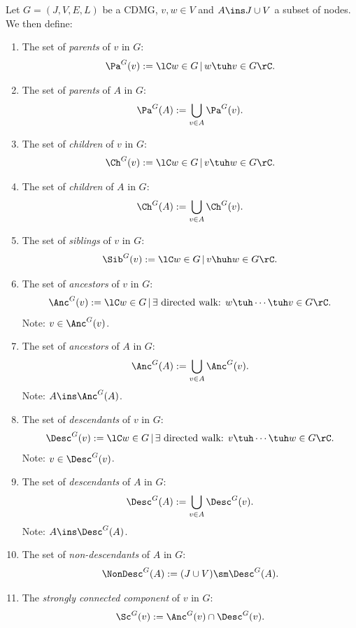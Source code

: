 \begin{Def}
     Let $G=(J,V,E,L)$ be a CDMG, $v,w \in V$ and $A \ins J \cup V$ a subset of nodes.
     We then define:
     \begin{enumerate}
         \item The set of \emph{parents} of $v$ in $G$: \[\Pa^G(v):=\lC w \in G\,|\, w \tuh v \in G \rC.\]
         \item[] The set of \emph{parents} of $A$ in $G$: \[\Pa^G(A):= \bigcup_{v \in A} \Pa^G(v).\]
         \item The set of \emph{children} of $v$ in $G$: \[\Ch^G(v):=\lC w \in G\,|\, v \tuh w \in G \rC.\]
         \item[] The set of \emph{children} of $A$ in $G$: \[\Ch^G(A):= \bigcup_{v \in A} \Ch^G(v).\]
         \item The set of \emph{siblings} of $v$ in $G$: \[\Sib^G(v):=\lC w \in G\,|\, v \huh w \in G \rC.\]
         \item The set of \emph{ancestors} of $v$ in $G$: 
             \[\Anc^G(v):=\lC w \in G\,|\,\exists \text{ directed walk: } w \tuh \cdots \tuh v \in G \rC.\]
             Note: $v \in \Anc^G(v)$.
         \item[] The set of \emph{ancestors} of $A$ in $G$: \[\Anc^G(A):= \bigcup_{v \in A} \Anc^G(v).\]
             Note: $A \ins \Anc^G(A)$.
         \item The set of \emph{descendants} of $v$ in $G$: 
             \[\Desc^G(v):=\lC w \in G\,|\,\exists \text{ directed walk: } v \tuh \cdots \tuh w \in G \rC.\]
             Note: $v \in \Desc^G(v)$.
         \item[] The set of \emph{descendants} of $A$ in $G$: \[\Desc^G(A):= \bigcup_{v \in A} \Desc^G(v).\]
             Note: $A \ins \Desc^G(A)$.
         \item The set of \emph{non-descendants} of $A$ in $G$:
             \[ \NonDesc^G(A) := (J \cup V) \sm \Desc^G(A).\]
         \item The \emph{strongly connected component} of $v$ in $G$:
             \[ \Sc^G(v) := \Anc^G(v) \cap \Desc^G(v).\]

\end{enumerate}
\end{Def}
